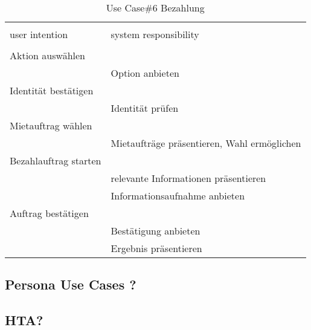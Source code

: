 \begin{table}[H]
\caption{Use Case\#6 Bezahlung }
\centering
\begin{tabular}{l l}
\\ [-0.5ex]

\hline\hline
\\ [-0.5ex]
user intention & system responsibility
\\ [1.5ex]
\hline
\\ [-0.5ex]
Aktion auswählen	 		& 											 \\[1ex]
							& Option anbieten							 \\[1ex]
Identität bestätigen		& 											 \\[1ex]
							& Identität prüfen							 \\[1ex]
Mietauftrag wählen		  	& 											 \\[1ex] 
							& Mietaufträge präsentieren, Wahl ermöglichen\\[1ex]
Bezahlauftrag starten		& 											 \\[1ex]
							& relevante Informationen präsentieren		 \\[1ex]
							& Informationsaufnahme anbieten	     		 \\[1ex]
Auftrag bestätigen			&	     									 \\[1ex]
							& Bestätigung anbieten				   		 \\[1ex]
							& Ergebnis präsentieren			    		 \\[1ex]

\hline
\end{tabular}
\label{tab:statuscodesUC}
\end{table}



\subsection{Persona Use Cases ?}
\subsection{HTA?}

